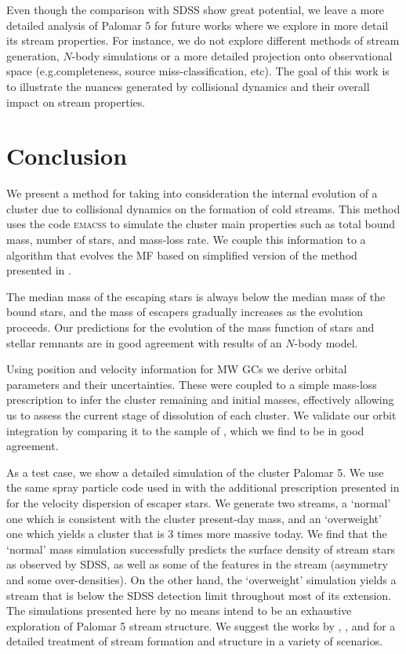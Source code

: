 \documentclass[useAMS,usenatbib,fleqn]{mnras}
\newcommand{\comm}[1]{#1}
\begin{document}
Even though the comparison with SDSS show great potential, we leave a more
detailed analysis of Palomar 5 for future works where we explore in more detail
its stream properties. For instance, we do not explore different methods of
stream generation, $N$-body simulations or a more detailed projection onto
observational space (e.g.completeness, source miss-classification, etc). The goal
of this work is to illustrate the nuances generated by collisional dynamics and
their overall impact on stream properties.

\section{Conclusion}

We present a method for taking into consideration the internal evolution of a
cluster due to collisional dynamics on the formation of cold streams. This
method uses the code \textsc{emacss} \citep{Alexander14} to simulate the cluster
main properties such as total bound mass, number of stars, and mass-loss rate.
We couple this information to a algorithm that evolves the MF based on
simplified version of the method presented in \citet{Lamers13}.

The median mass of the escaping stars is always below the median mass of the
bound stars, and the mass of escapers gradually increases as the evolution
proceeds. Our predictions \comm{for the evolution of the mass function of stars
and stellar remnants} are in good agreement with \comm{results of an} $N$-body
model.

Using position and velocity information for MW GCs we derive orbital parameters
and their uncertainties. These were coupled to a simple mass-loss prescription
to infer the cluster remaining and initial masses, effectively allowing us to
assess the current stage of dissolution of each cluster. We validate our orbit
integration by comparing it to the sample of \citet{mpv14}, which we find to be
in good agreement.

As a test case, we show a detailed simulation of the cluster Palomar 5. We use
the same spray particle code used in \citet{Kuepper15} with the additional
prescription presented in \citet{Claydon16} for the velocity dispersion of
escaper stars. We generate two streams, a `normal' one which is consistent with
the cluster present-day mass, and an `overweight' one which yields a cluster
that is 3 times more massive today. We find that the `normal' mass simulation
successfully predicts the surface density of stream stars as observed by SDSS,
as well as some of the features in the stream (asymmetry and some
over-densities). On the other hand, the `overweight' simulation yields a stream
that is below the SDSS detection limit throughout most of its extension.
\comm{The simulations presented here by no means intend to be an exhaustive
exploration of Palomar 5 stream structure. We suggest the works by
\citet{Pearson15}, \citet{Kuepper15}, and \citet{APW16} for a detailed treatment
of stream formation and structure in a variety of scenarios.}
\end{document}
